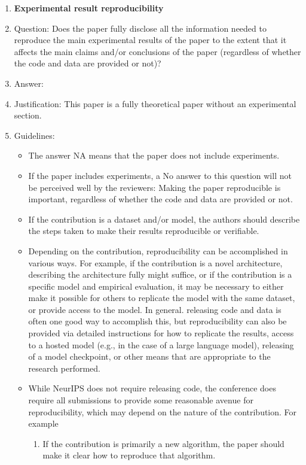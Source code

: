 \documentclass{article}
\theoremstyle{plain}
\theoremstyle{definition}
\theoremstyle{remark}
\begin{document}
\begin{enumerate}
    \item {\bf Experimental result reproducibility}
    \item[] Question: Does the paper fully disclose all the information needed to reproduce the main experimental results of the paper to the extent that it affects the main claims and/or conclusions of the paper (regardless of whether the code and data are provided or not)?
    \item[] Answer: \answerNA{} %
    \item[] Justification: This paper is a fully theoretical paper without an experimental section.
    \item[] Guidelines:
    \begin{itemize}
        \item The answer NA means that the paper does not include experiments.
        \item If the paper includes experiments, a No answer to this question will not be perceived well by the reviewers: Making the paper reproducible is important, regardless of whether the code and data are provided or not.
        \item If the contribution is a dataset and/or model, the authors should describe the steps taken to make their results reproducible or verifiable. 
        \item Depending on the contribution, reproducibility can be accomplished in various ways. For example, if the contribution is a novel architecture, describing the architecture fully might suffice, or if the contribution is a specific model and empirical evaluation, it may be necessary to either make it possible for others to replicate the model with the same dataset, or provide access to the model. In general. releasing code and data is often one good way to accomplish this, but reproducibility can also be provided via detailed instructions for how to replicate the results, access to a hosted model (e.g., in the case of a large language model), releasing of a model checkpoint, or other means that are appropriate to the research performed.
        \item While NeurIPS does not require releasing code, the conference does require all submissions to provide some reasonable avenue for reproducibility, which may depend on the nature of the contribution. For example
        \begin{enumerate}
            \item If the contribution is primarily a new algorithm, the paper should make it clear how to reproduce that algorithm.

\end{enumerate}
\end{itemize}
\end{enumerate}
\end{document}
